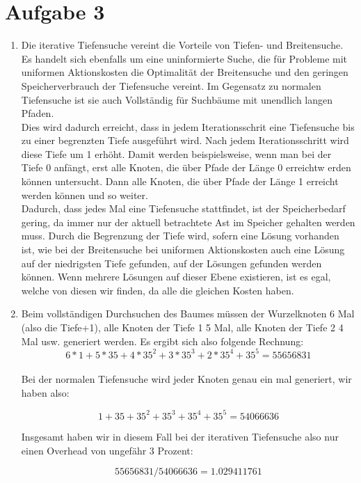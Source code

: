 \documentclass[a4paper,10pt]{article}
\begin{document}
\section*{Aufgabe 3}
\begin{enumerate}[~~a)]
    \item
    Die iterative Tiefensuche vereint die Vorteile von Tiefen- und Breitensuche. Es handelt sich ebenfalls um eine uninformierte Suche, die für Probleme mit uniformen Aktionskosten die Optimalität der Breitensuche und den geringen Speicherverbrauch der Tiefensuche vereint. Im Gegensatz zu normalen Tiefensuche ist sie auch Vollständig für Suchbäume mit unendlich langen Pfaden. \\
Dies wird dadurch erreicht, dass in jedem Iterationsschrit eine Tiefensuche bis zu einer begrenzten Tiefe ausgeführt wird. Nach jedem Iterationsschritt wird diese Tiefe um 1 erhöht. Damit werden beispielsweise, wenn man bei der Tiefe 0 anfängt, erst alle Knoten, die über Pfade der Länge 0 erreichtw erden können untersucht. Dann alle Knoten, die über Pfade der Länge 1 erreicht werden können und so weiter. \\
Dadurch, dass jedes Mal eine Tiefensuche stattfindet, ist der Speicherbedarf gering, da immer nur der aktuell betrachtete Ast im Speicher gehalten werden muss. Durch die Begrenzung der Tiefe wird, sofern eine Lösung vorhanden ist, wie bei der Breitensuche bei uniformen Aktionskosten auch eine Lösung auf der niedrigsten Tiefe gefunden, auf der Lösungen gefunden werden können. Wenn mehrere Lösungen auf dieser Ebene existieren, ist es egal, welche von diesen wir finden, da alle die gleichen Kosten haben. \\

    \item
    Beim vollständigen Durchsuchen des Baumes müssen der Wurzelknoten 6 Mal (also die Tiefe+1), alle Knoten der Tiefe 1 5 Mal, alle Knoten der Tiefe 2 4 Mal usw. generiert werden. Es ergibt sich also folgende Rechnung:
    $$ 6*1 + 5*35 + 4*35^2 + 3*35^3 + 2*35^4 + 35^5 = 55 656 831 $$\\
    
    Bei der normalen Tiefensuche wird jeder Knoten genau ein mal generiert, wir haben also:
    
    $$ 1 + 35 + 35^2 + 35^3 + 35^4 + 35^5 = 54 066 636$$
    
    Insgesamt haben wir in diesem Fall bei der iterativen Tiefensuche also nur einen Overhead von ungefähr 3 Prozent:
    
    $$55656831/54066636 = 1.029411761$$


\end{enumerate}
\end{document}
